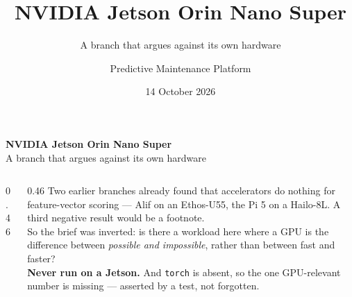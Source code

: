 \documentclass[aspectratio=169,10pt]{beamer}
\title[Jetson Orin]{NVIDIA Jetson Orin Nano Super}
\subtitle{A branch that argues against its own hardware}
\author{Predictive Maintenance Platform}
\date{14 October 2026}
\begin{document}
\begin{frame}[plain]
  \vspace{5mm}
  {\LARGE\bfseries NVIDIA Jetson Orin Nano Super}\\[2mm]
  {\large\color{pdmink2} A branch that argues against its own hardware}\par
  \vspace{5mm}\noindent{\color{pdmrule}\rule{\linewidth}{0.4pt}}\par
  \vspace{3mm}
  \begin{columns}[T]
    \begin{column}{0.46\textwidth}
      \scriptsize
      \\[1mm]
      \\[1mm]
      \\[1mm]
      \\[1mm]
      \\[1mm]
    \end{column}
    \begin{column}{0.46\textwidth}
      \scriptsize\color{pdmink2}
      Two earlier branches already found that accelerators do nothing for
      feature-vector scoring --- Alif on an Ethos-U55, the Pi 5 on a Hailo-8L.
      A third negative result would be a footnote.
      \\[2mm]
      So the brief was inverted: is there a workload here where a GPU is the
      difference between \emph{possible and impossible}, rather than between
      fast and faster?
      \\[2mm]
      \textbf{Never run on a Jetson.} And \texttt{torch} is absent, so the one
      GPU-relevant number is missing --- asserted by a test, not forgotten.
    \end{column}
  \end{columns}
\end{frame}
\end{document}
